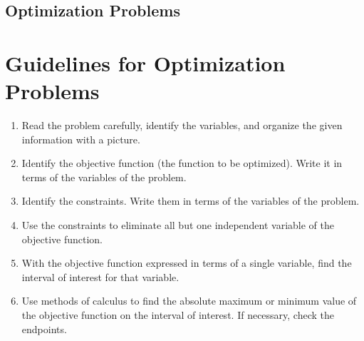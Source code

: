 %
%
%

\subsection{Optimization Problems}
\section{Guidelines for Optimization Problems}
\begin{enumerate}
    \item Read the problem carefully, identify the variables, and organize the given information with a picture.
    \item Identify the objective function (the function to be optimized). Write it in terms of the variables of the problem.
    \item Identify the constraints. Write them in terms of the variables of the problem.
    \item Use the constraints to eliminate all but one independent variable of the objective function.
    \item With the objective function expressed in terms of a single variable, find the interval of interest for that variable.
    \item Use methods of calculus to find the absolute maximum or minimum value of the objective function on the interval of interest. If necessary, check the endpoints.
\end{enumerate}
